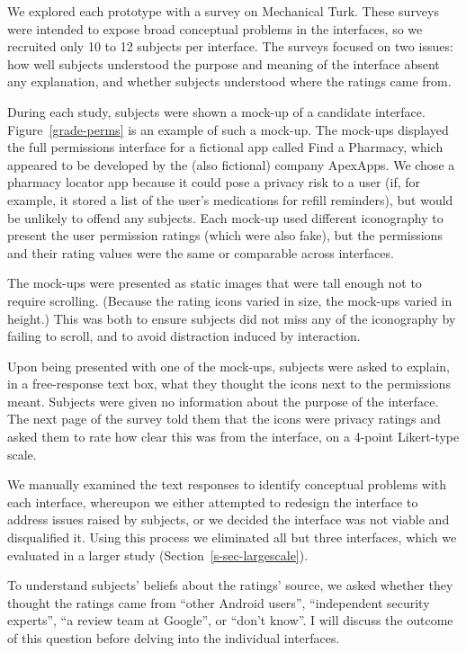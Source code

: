\documentclass[11pt]{article}
\newcommand{\reffig}[1]{Figure~\ref{#1}}
\newcommand{\refsec}[1]{Section~\ref{#1}}
\begin{document}
We explored each prototype with a survey on Mechanical Turk.
These surveys were 
intended to expose broad conceptual problems 
in the interfaces, so we recruited only 10 to 12 
subjects per interface. The surveys focused on two issues: how well subjects 
understood the purpose and meaning of the interface absent any explanation, 
and whether subjects understood where the ratings came from.

During each study, subjects were shown a mock-up of
a candidate interface. \reffig{grade-perms}
is an example of such a mock-up. The mock-ups displayed the full permissions
interface for a fictional app called Find a Pharmacy, which appeared 
to be developed by the (also fictional) company ApexApps. 
We chose a pharmacy locator app because it 
could pose a privacy risk to a user (if, for example, it stored a list
of the user's medications for refill reminders), but 
would be unlikely to offend any 
subjects. Each mock-up used different iconography to
present the user permission ratings (which were also fake), but the permissions
and their rating values were the same or comparable across interfaces. 

The mock-ups were presented as static images that were tall enough
not to require scrolling. (Because the rating icons
varied in size, the mock-ups varied in height.) This was both
to ensure subjects did not miss any of the iconography by failing to
scroll, and to avoid distraction induced by interaction.

Upon being presented with one of the mock-ups, subjects were
asked to explain, in a free-response text box, 
what they thought the icons next to the permissions 
meant. Subjects were given no information about the 
purpose of the interface. The next page of the survey 
told them that the icons were privacy 
ratings and asked them to rate how clear this was from 
the interface, on a 4-point Likert-type scale. 

We manually examined 
the text responses to identify conceptual problems with each 
interface, whereupon we either attempted 
to redesign the interface to address issues raised by subjects, 
or we decided the interface was not viable and disqualified it.
Using this process we eliminated all but three interfaces, which we evaluated
in a larger study (\refsec{s-sec-largescale}).

To understand subjects' beliefs about the ratings' source, we asked
whether they thought the ratings came from 
 ``other Android users'', ``independent 
security experts'', ``a review team at Google'', or
``don't know''. I will discuss the outcome of this question
before delving into the individual interfaces.
\end{document}
